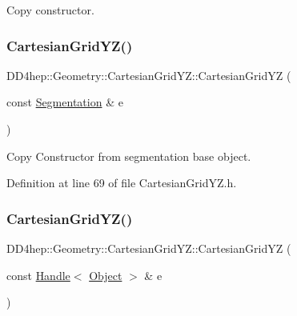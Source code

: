 Copy constructor. 

\hypertarget{class_d_d4hep_1_1_geometry_1_1_cartesian_grid_y_z_ae3f9ea2435ad2c614ef57d1acd4bef8d}{}\label{class_d_d4hep_1_1_geometry_1_1_cartesian_grid_y_z_ae3f9ea2435ad2c614ef57d1acd4bef8d} 
\subsubsection{\texorpdfstring{Cartesian\+Grid\+Y\+Z()}{CartesianGridYZ()}\hspace{0.1cm}{\footnotesize\ttfamily [3/5]}}
{\footnotesize\ttfamily D\+D4hep\+::\+Geometry\+::\+Cartesian\+Grid\+Y\+Z\+::\+Cartesian\+Grid\+YZ (\begin{DoxyParamCaption}\item[{const \hyperlink{class_d_d4hep_1_1_geometry_1_1_segmentation}{Segmentation} \&}]{e }\end{DoxyParamCaption})\hspace{0.3cm}{\ttfamily [inline]}}



Copy Constructor from segmentation base object. 



Definition at line 69 of file Cartesian\+Grid\+Y\+Z.\+h.

\hypertarget{class_d_d4hep_1_1_geometry_1_1_cartesian_grid_y_z_ab68e61e001c4eea7d4e6aa57dc7f99e4}{}\label{class_d_d4hep_1_1_geometry_1_1_cartesian_grid_y_z_ab68e61e001c4eea7d4e6aa57dc7f99e4} 
\subsubsection{\texorpdfstring{Cartesian\+Grid\+Y\+Z()}{CartesianGridYZ()}\hspace{0.1cm}{\footnotesize\ttfamily [4/5]}}
{\footnotesize\ttfamily D\+D4hep\+::\+Geometry\+::\+Cartesian\+Grid\+Y\+Z\+::\+Cartesian\+Grid\+YZ (\begin{DoxyParamCaption}\item[{const \hyperlink{class_d_d4hep_1_1_handle}{Handle}$<$ \hyperlink{class_d_d4hep_1_1_geometry_1_1_cartesian_grid_y_z_ad5db30e8623d30e9f23f0c4f8e0b546e}{Object} $>$ \&}]{e }\end{DoxyParamCaption})\hspace{0.3cm}{\ttfamily [inline]}}



